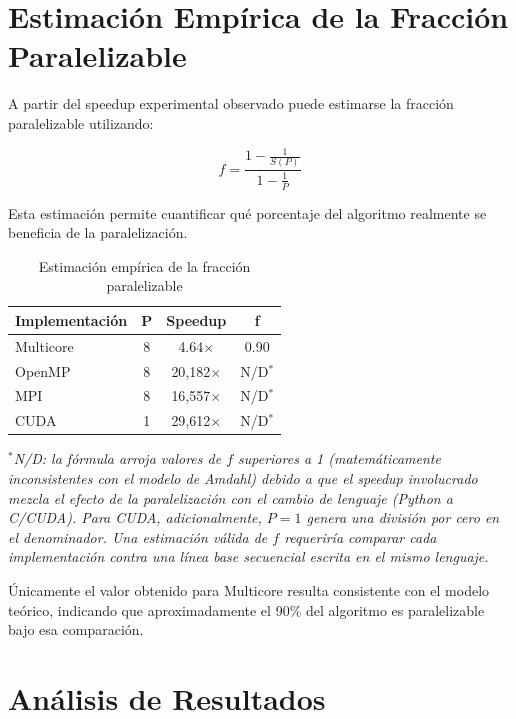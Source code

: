 \section{Estimación Empírica de la Fracción Paralelizable}
\label{sec:amdahl_empirico}

A partir del speedup experimental observado puede estimarse la fracción paralelizable utilizando:

\[
f=
\frac{1-\frac{1}{S(P)}}
     {1-\frac{1}{P}}
\]

Esta estimación permite cuantificar qué porcentaje del algoritmo realmente se beneficia de la paralelización.

\begin{table}[H]
\centering
\caption{Estimación empírica de la fracción paralelizable}
\begin{tabular}{lccc}
\toprule
Implementación & P & Speedup & f \\
\midrule
Multicore & 8 & 4.64$\times$  & 0.90 \\
OpenMP    & 8 & 20{,}182$\times$ & N/D$^{*}$ \\
MPI       & 8 & 16{,}557$\times$ & N/D$^{*}$ \\
CUDA      & 1 & 29{,}612$\times$ & N/D$^{*}$ \\
\bottomrule
\end{tabular}
\end{table}

\textit{$^{*}$N/D: la fórmula arroja valores de $f$ superiores a 1 (matemáticamente inconsistentes con el modelo de Amdahl) debido a que el speedup involucrado mezcla el efecto de la paralelización con el cambio de lenguaje (Python a C/CUDA). Para CUDA, adicionalmente, $P=1$ genera una división por cero en el denominador. Una estimación válida de $f$ requeriría comparar cada implementación contra una línea base secuencial escrita en el mismo lenguaje.}

Únicamente el valor obtenido para Multicore resulta consistente con el modelo teórico, indicando que aproximadamente el 90\% del algoritmo es paralelizable bajo esa comparación.

\section{Análisis de Resultados}

